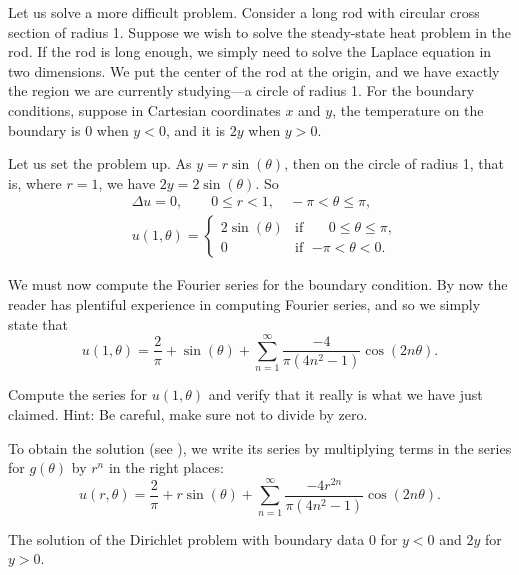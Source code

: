 \begin{example}
Let us solve a more difficult problem.
Consider a long
rod with circular cross section of radius 1.  Suppose we wish to solve the
steady-state heat problem in the rod.
If the rod is long enough, we simply need to solve
the Laplace equation in two dimensions.  We put the center of the rod at
the origin, and we have exactly the region we are currently
studying---a circle of radius 1.  For the boundary conditions, suppose in
Cartesian coordinates $x$ and
$y$, the temperature on the boundary is 0 when $y < 0$, and it is $2y$ when $y > 0$.

Let us set the problem up.
As $y = r\sin(\theta)$, then on the
circle of radius 1, that is, where $r=1$, we have $2y = 2\sin(\theta)$.  So
\begin{align*}
& \Delta u = 0 , \qquad 0 \leq r < 1, \quad -\pi < \theta \leq \pi,\\
& u(1,\theta) = 
\begin{cases}
2\sin(\theta) & \text{if } \; \phantom{-}0 \leq \theta \leq \pi, \\
0 & \text{if } \; {-\pi} < \theta < 0.
\end{cases}
\end{align*}

We must now compute the Fourier series for the boundary
condition.  By now the reader has plentiful experience in computing
Fourier series, and so we simply state that 
\begin{equation*}
u(1,\theta) = 
\frac{2}{\pi}
+
\sin(\theta)
+
\sum_{n=1}^\infty \frac{-4}{\pi(4n^2-1)} \cos(2n\theta) .
\end{equation*}

\begin{exercise}
Compute the series for $u(1,\theta)$ and verify that it really is what
we have just claimed.  Hint: Be careful, make sure not to divide by zero.
\end{exercise}

To obtain the solution (see ), we
write its series by multiplying terms in the series for $g(\theta)$
by $r^n$ in the right places:
\begin{equation*}
u(r,\theta) = 
\frac{2}{\pi}
+
r\sin(\theta)
+
\sum_{n=1}^\infty \frac{-4r^{2n}}{\pi(4n^2-1)} \cos(2n\theta) .
\end{equation*}
\begin{myfig}
\capstart
{}
\caption{The solution of the Dirichlet problem with
boundary data 0 for $y < 0$ and $2y$ for $y > 0$.\label{dirichdisc:zero2yfig}}
\end{myfig}
\end{example}

